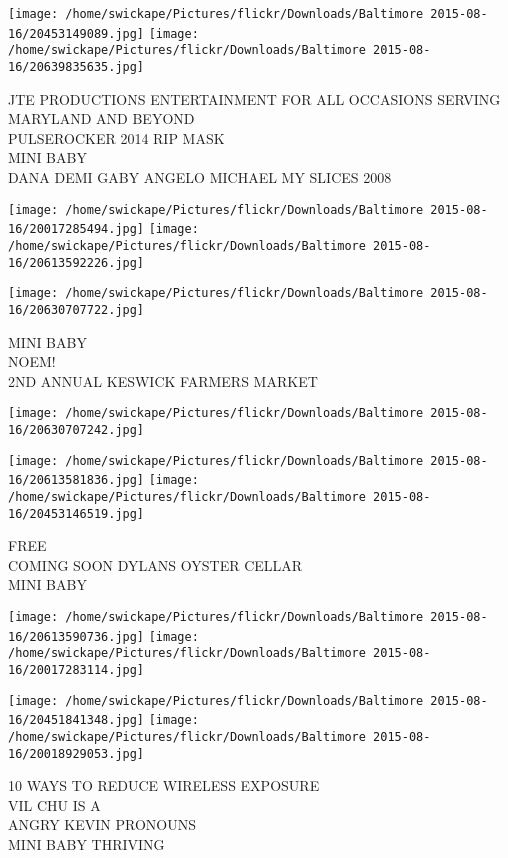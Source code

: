 \documentclass[10pt,letterpaper]{article}
\begin{document}
\texttt{[image: /home/swickape/Pictures/flickr/Downloads/Baltimore 2015-08-16/20453149089.jpg]}
\texttt{[image: /home/swickape/Pictures/flickr/Downloads/Baltimore 2015-08-16/20639835635.jpg]}

JTE PRODUCTIONS ENTERTAINMENT FOR ALL OCCASIONS SERVING MARYLAND AND BEYOND\\
PULSEROCKER 2014 RIP MASK\\
MINI BABY\\
DANA DEMI GABY ANGELO MICHAEL MY SLICES 2008
\pagebreak

\texttt{[image: /home/swickape/Pictures/flickr/Downloads/Baltimore 2015-08-16/20017285494.jpg]}
\texttt{[image: /home/swickape/Pictures/flickr/Downloads/Baltimore 2015-08-16/20613592226.jpg]}

\texttt{[image: /home/swickape/Pictures/flickr/Downloads/Baltimore 2015-08-16/20630707722.jpg]}

MINI BABY\\
NOEM!\\
2ND ANNUAL KESWICK FARMERS MARKET
\pagebreak

\texttt{[image: /home/swickape/Pictures/flickr/Downloads/Baltimore 2015-08-16/20630707242.jpg]}

\vspace{0.25in}
\texttt{[image: /home/swickape/Pictures/flickr/Downloads/Baltimore 2015-08-16/20613581836.jpg]}
\texttt{[image: /home/swickape/Pictures/flickr/Downloads/Baltimore 2015-08-16/20453146519.jpg]}

FREE\\
COMING SOON DYLANS OYSTER CELLAR\\
MINI BABY
\pagebreak

\texttt{[image: /home/swickape/Pictures/flickr/Downloads/Baltimore 2015-08-16/20613590736.jpg]}
\texttt{[image: /home/swickape/Pictures/flickr/Downloads/Baltimore 2015-08-16/20017283114.jpg]}

\texttt{[image: /home/swickape/Pictures/flickr/Downloads/Baltimore 2015-08-16/20451841348.jpg]}
\texttt{[image: /home/swickape/Pictures/flickr/Downloads/Baltimore 2015-08-16/20018929053.jpg]}

10 WAYS TO REDUCE WIRELESS EXPOSURE\\
VIL CHU IS A\\
ANGRY KEVIN PRONOUNS\\
MINI BABY THRIVING
\pagebreak
\end{document}

